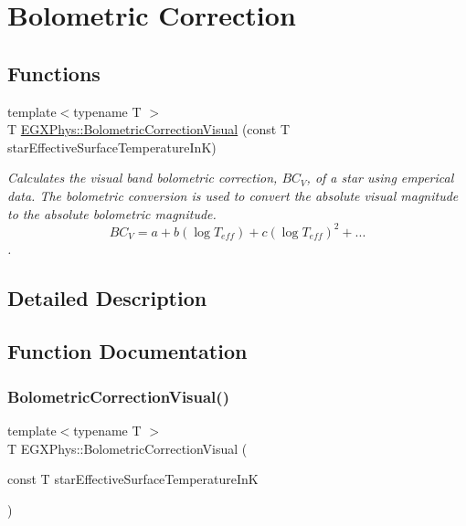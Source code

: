 \hypertarget{group___e_g_x_phys-_astrophysic-_bolometric_correction}{}\section{Bolometric Correction}
\label{group___e_g_x_phys-_astrophysic-_bolometric_correction}
\subsection*{Functions}
\begin{DoxyCompactItemize}
\item 
{\footnotesize template$<$typename T $>$ }\\T \mbox{\hyperlink{group___e_g_x_phys-_astrophysic-_bolometric_correction_ga31e794be67c861c4eb84d58e8e88883c}{E\+G\+X\+Phys\+::\+Bolometric\+Correction\+Visual}} (const T star\+Effective\+Surface\+Temperature\+InK)
\begin{DoxyCompactList}\small\item\em Calculates the visual band bolometric correction, $BC_{V}$, of a star using emperical data. The bolometric conversion is used to convert the absolute visual magnitude to the absolute bolometric magnitude. \[ BC_{V}=a + b ( \log T_{eff}) + c ( \log T_{eff})^2 + ...\]. \end{DoxyCompactList}\end{DoxyCompactItemize}


\subsection{Detailed Description}


\subsection{Function Documentation}
\mbox{\label{group___e_g_x_phys-_astrophysic-_bolometric_correction_ga31e794be67c861c4eb84d58e8e88883c}} 
\subsubsection{\texorpdfstring{Bolometric\+Correction\+Visual()}{BolometricCorrectionVisual()}}
{\footnotesize\ttfamily template$<$typename T $>$ \\
T E\+G\+X\+Phys\+::\+Bolometric\+Correction\+Visual (\begin{DoxyParamCaption}\item[{const T}]{star\+Effective\+Surface\+Temperature\+InK }\end{DoxyParamCaption})}



